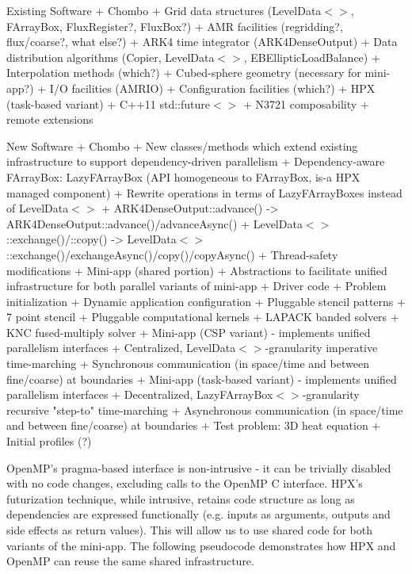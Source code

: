 \documentclass[final,letterpaper,10pt]{article}
\begin{document}
Existing Software 
  + Chombo
    + Grid data structures (LevelData$<>$, FArrayBox, FluxRegister?, FluxBox?)
    + AMR facilities (regridding?, flux/coarse?, what else?) 
    + ARK4 time integrator (ARK4DenseOutput)
    + Data distribution algorithms (Copier, LevelData$<>$, EBEllipticLoadBalance)
    + Interpolation methods (which?)
    + Cubed-sphere geometry (necessary for mini-app?)
    + I/O facilities (AMRIO)
    + Configuration facilities (which?)
  + HPX (task-based variant)
    + C++11 std::future$<>$ + N3721 composability + remote extensions

New Software
  + Chombo 
    + New classes/methods which extend existing infrastructure to support dependency-driven parallelism 
      + Dependency-aware FArrayBox: LazyFArrayBox (API homogeneous to FArrayBox, is-a HPX managed component)
      + Rewrite operations in terms of LazyFArrayBoxes instead of LevelData$<>$
        + ARK4DenseOutput::advance() -> ARK4DenseOutput::advance()/advanceAsync()
        + LevelData$<>$::exchange()/::copy() -> LevelData$<>$::exchange()/exchangeAsync()/copy()/copyAsync() 
    + Thread-safety modifications
  + Mini-app (shared portion)
    + Abstractions to facilitate unified infrastructure for both parallel variants of mini-app
    + Driver code
      + Problem initialization
      + Dynamic application configuration
    + Pluggable stencil patterns 
      + 7 point stencil 
    + Pluggable computational kernels
      + LAPACK banded solvers
      + KNC fused-multiply solver
  + Mini-app (CSP variant) - implements unified parallelism interfaces 
    + Centralized, LevelData$<>$-granularity imperative time-marching 
    + Synchronous communication (in space/time and between fine/coarse) at boundaries
  + Mini-app (task-based variant) - implements unified parallelism interfaces
    + Decentralized, LazyFArrayBox$<>$-granularity recursive "step-to" time-marching 
    + Asynchronous communication (in space/time and between fine/coarse) at boundaries
  + Test problem: 3D heat equation
    + Initial profiles (?)

OpenMP's pragma-based interface is non-intrusive - it can be trivially disabled
with no code changes, excluding calls to the OpenMP C interface. HPX's
futurization technique, while intrusive, retains code structure as long as
dependencies are expressed functionally (e.g. inputs as arguments, outputs and
side effects as return values). This will allow us to use shared code for both
variants of the mini-app. The following pseudocode demonstrates how HPX and
OpenMP can reuse the same shared infrastructure.
\end{document}
